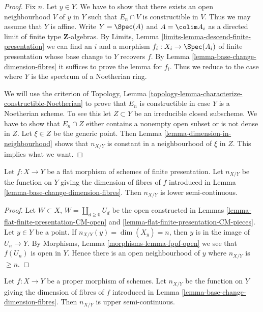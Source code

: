\begin{proof}
Fix $n$. Let $y \in Y$. We have to show that there exists an open neighbourhood
$V$ of $y$ in $Y$ such that $E_n \cap V$ is constructible in $V$. Thus we may
assume that $Y$ is affine. Write $Y = \Spec(A)$ and
$A = \colim A_i$ as a directed limit of finite type
$\mathbf{Z}$-algebras. By
Limits, Lemma \ref{limits-lemma-descend-finite-presentation}
we can find an $i$ and a morphism $f_i : X_i \to \Spec(A_i)$ of
finite presentation whose base change to $Y$ recovers $f$. By
Lemma \ref{lemma-base-change-dimension-fibres}
it suffices to prove the lemma for $f_i$. Thus we reduce to
the case where $Y$ is the spectrum of a Noetherian ring.

\medskip\noindent
We will use the criterion of
Topology, Lemma \ref{topology-lemma-characterize-constructible-Noetherian}
to prove that $E_n$ is constructible in case $Y$ is a Noetherian scheme.
To see this let $Z \subset Y$ be an irreducible closed subscheme.
We have to show that $E_n \cap Z$ either contains a nonempty open subset
or is not dense in $Z$. Let $\xi \in Z$ be the generic point. Then
Lemma \ref{lemma-dimension-in-neighbourhood}
shows that $n_{X/Y}$ is constant in a neighbourhood of $\xi$ in $Z$.
This implies what we want.
\end{proof}

\begin{lemma}
\label{lemma-dimension-fibres-flat}
Let $f : X \to Y$ be a flat morphism of schemes of finite presentation. Let
$n_{X/Y}$ be the function on $Y$ giving the dimension of fibres of $f$
introduced in Lemma \ref{lemma-base-change-dimension-fibres}.
Then $n_{X/Y}$ is lower semi-continuous.
\end{lemma}

\begin{proof}
Let $W \subset X$, $W = \coprod_{d \geq 0} U_d$ be the open constructed in
Lemmas \ref{lemma-flat-finite-presentation-CM-open} and
\ref{lemma-flat-finite-presentation-CM-pieces}.
Let $y \in Y$ be a point. If $n_{X/Y}(y) = \dim(X_y) = n$, then
$y$ is in the image of $U_n \to Y$.
By Morphisms, Lemma \ref{morphisms-lemma-fppf-open}
we see that $f(U_n)$ is open in $Y$.
Hence there is an open neighbourhood of $y$ where
$n_{X/Y}$ is $\geq n$.
\end{proof}

\begin{lemma}
\label{lemma-dimension-fibres-proper}
Let $f : X \to Y$ be a proper morphism of schemes. Let
$n_{X/Y}$ be the function on $Y$ giving the dimension of fibres of $f$
introduced in Lemma \ref{lemma-base-change-dimension-fibres}.
Then $n_{X/Y}$ is upper semi-continuous.
\end{lemma}

